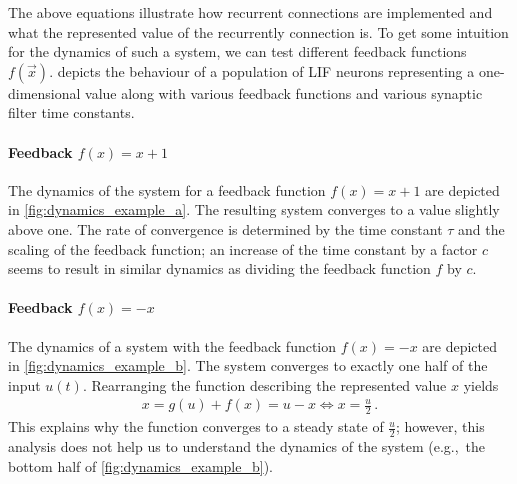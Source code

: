 \documentclass[10pt,letterpaper,oneside]{article}
\begin{document}
The above equations illustrate how recurrent connections are implemented and what the represented value of the recurrently connection is. To get some intuition for the dynamics of such a system, we can test different feedback functions $f(\vec x)$.  depicts the behaviour of a population of LIF neurons representing a one-dimensional value along with various feedback functions and various synaptic filter time constants.


\paragraph{Feedback $f(x) = x + 1$}
The dynamics of the system for a feedback function $f(x) = x + 1$ are depicted in \cref{fig:dynamics_example_a}. The resulting system converges to a value slightly above one. The rate of convergence is determined by the time constant $\tau$ and the scaling of the feedback function; an increase of the time constant by a factor $c$ seems to result in similar dynamics as dividing the feedback function $f$ by $c$.


\paragraph{Feedback $f(x) = -x$}
The dynamics of a system with the feedback function $f(x) = -x$ are depicted in \cref{fig:dynamics_example_b}. The system converges to exactly one half of the input $u(t)$. Rearranging the function describing the represented value $x$ yields
\begin{align*}
	x = g(u) + f(x) = u - x \Leftrightarrow x = \frac{u}2 \,.
\end{align*}
This explains why the function converges to a steady state of $\frac{u}2$; however, this analysis does not help us to understand the dynamics of the system (e.g.,~the bottom half of \cref{fig:dynamics_example_b}).
\end{document}

